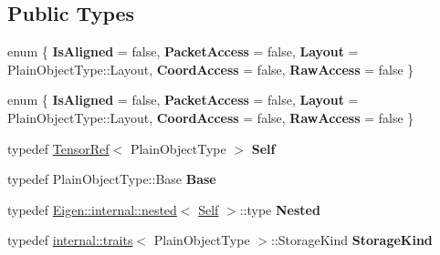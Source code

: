 \subsection*{Public Types}
\begin{DoxyCompactItemize}
\item 
\mbox{\label{class_eigen_1_1_tensor_ref_ae5e0d48f346503cfd7d43cc4d3bed6c9}} 
enum \{ \newline
{\bfseries Is\+Aligned} = false, 
{\bfseries Packet\+Access} = false, 
{\bfseries Layout} = Plain\+Object\+Type\+:\+:Layout, 
{\bfseries Coord\+Access} = false, 
\newline
{\bfseries Raw\+Access} = false
 \}
\item 
\mbox{\label{class_eigen_1_1_tensor_ref_a9abf83c6ff40dc02e2af62130426f293}} 
enum \{ \newline
{\bfseries Is\+Aligned} = false, 
{\bfseries Packet\+Access} = false, 
{\bfseries Layout} = Plain\+Object\+Type\+:\+:Layout, 
{\bfseries Coord\+Access} = false, 
\newline
{\bfseries Raw\+Access} = false
 \}
\item 
\mbox{\label{class_eigen_1_1_tensor_ref_ab05281a7d56a24f4a88114d67b64ad1a}} 
typedef \hyperlink{class_eigen_1_1_tensor_ref}{Tensor\+Ref}$<$ Plain\+Object\+Type $>$ {\bfseries Self}
\item 
\mbox{\label{class_eigen_1_1_tensor_ref_a96d89ad1da9d1af09fa63b1e03970655}} 
typedef Plain\+Object\+Type\+::\+Base {\bfseries Base}
\item 
\mbox{\label{class_eigen_1_1_tensor_ref_ab80332ca8505a10fd21fb585f3bbe8e4}} 
typedef \hyperlink{struct_eigen_1_1internal_1_1nested}{Eigen\+::internal\+::nested}$<$ \hyperlink{class_eigen_1_1_tensor_ref}{Self} $>$\+::type {\bfseries Nested}
\item 
\mbox{\label{class_eigen_1_1_tensor_ref_aec0b9c51310c68fe4b9092cd61279305}} 
typedef \hyperlink{struct_eigen_1_1internal_1_1traits}{internal\+::traits}$<$ Plain\+Object\+Type $>$\+::Storage\+Kind {\bfseries Storage\+Kind}
\item 
\mbox{\label{class_eigen_1_1_tensor_ref_a1526154744d500392e87dc4fc67bc198}} 

\end{DoxyCompactItemize}
